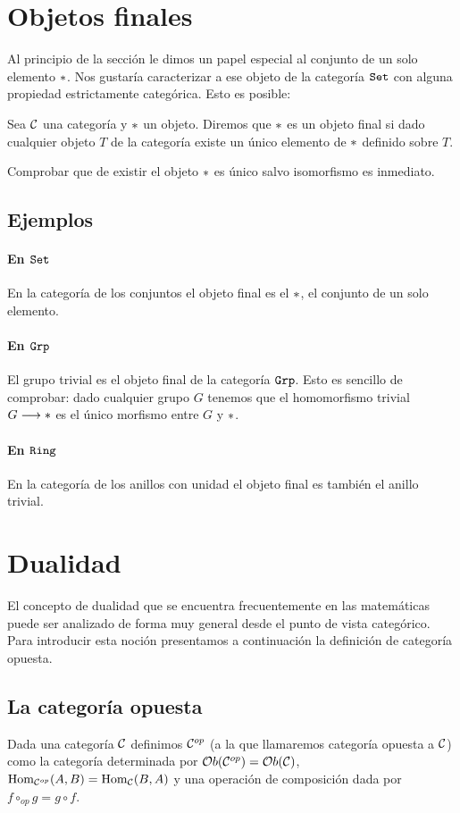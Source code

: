 \section{Objetos finales}
Al principio de la sección le dimos un papel especial al conjunto
de un solo elemento $*$. Nos gustaría caracterizar a ese objeto de
la categoría $\texttt{Set}$ con alguna propiedad estrictamente categórica.
Esto es posible:

\begin{definition}
Sea $\mathcal{C}$ una categoría y $*$ un objeto. Diremos que $*$ es un objeto
final si dado cualquier objeto $T$ de la categoría existe un
único elemento de $*$ definido sobre $T$.
\end{definition}

Comprobar que de existir el objeto $*$ es único salvo isomorfismo
es inmediato.
\subsection{Ejemplos}
\paragraph{En $\texttt{Set}$}
En la categoría de los conjuntos el objeto final es el $*$,
el conjunto de un solo elemento.

\paragraph{En $\texttt{Grp}$}
El grupo trivial es el objeto final de la categoría $\texttt{Grp}$.
Esto es sencillo de comprobar: dado cualquier grupo $G$ tenemos
que el homomorfismo trivial $G\longrightarrow *$ es el único morfismo
entre $G$ y $*$.

\paragraph{En $\texttt{Ring}$}
En la categoría de los anillos con unidad el objeto final es
también el anillo trivial.

\section{Dualidad}
El concepto de dualidad que se encuentra frecuentemente en las
matemáticas puede ser analizado de forma muy general desde el punto
de vista categórico. Para introducir esta noción presentamos a
continuación la definición de categoría opuesta.

\subsection{La categoría opuesta}
\begin{definition}
Dada una categoría $\mathcal{C}$ definimos
$\mathcal{C}^{op}$ (a la que llamaremos categoría opuesta a $\mathcal{C}$)
como la categoría determinada por $\mathcal{O}b(\mathcal{C}^{op}) = \mathcal{O}b(\mathcal{C})$,
$\operatorname{Hom}_{\mathcal{C}^{op}}(A, B) = \operatorname{Hom}_{\mathcal{C}}(B, A)$ y una operación de
composición dada por $f \circ_{op} g = g \circ f$.
\end{definition}

